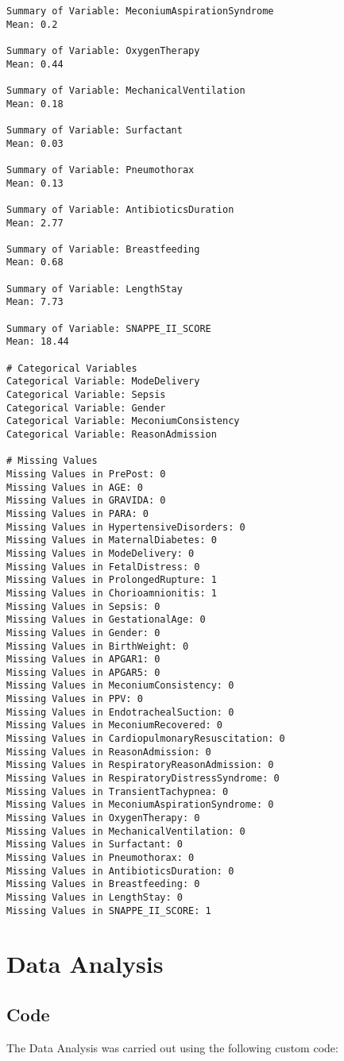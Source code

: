 \documentclass[11pt]{article}
\begin{document}
\begin{Verbatim}[tabsize=4]
Summary of Variable: MeconiumAspirationSyndrome
Mean: 0.2

Summary of Variable: OxygenTherapy
Mean: 0.44

Summary of Variable: MechanicalVentilation
Mean: 0.18

Summary of Variable: Surfactant
Mean: 0.03

Summary of Variable: Pneumothorax
Mean: 0.13

Summary of Variable: AntibioticsDuration
Mean: 2.77

Summary of Variable: Breastfeeding
Mean: 0.68

Summary of Variable: LengthStay
Mean: 7.73

Summary of Variable: SNAPPE_II_SCORE
Mean: 18.44

# Categorical Variables
Categorical Variable: ModeDelivery
Categorical Variable: Sepsis
Categorical Variable: Gender
Categorical Variable: MeconiumConsistency
Categorical Variable: ReasonAdmission

# Missing Values
Missing Values in PrePost: 0
Missing Values in AGE: 0
Missing Values in GRAVIDA: 0
Missing Values in PARA: 0
Missing Values in HypertensiveDisorders: 0
Missing Values in MaternalDiabetes: 0
Missing Values in ModeDelivery: 0
Missing Values in FetalDistress: 0
Missing Values in ProlongedRupture: 1
Missing Values in Chorioamnionitis: 1
Missing Values in Sepsis: 0
Missing Values in GestationalAge: 0
Missing Values in Gender: 0
Missing Values in BirthWeight: 0
Missing Values in APGAR1: 0
Missing Values in APGAR5: 0
Missing Values in MeconiumConsistency: 0
Missing Values in PPV: 0
Missing Values in EndotrachealSuction: 0
Missing Values in MeconiumRecovered: 0
Missing Values in CardiopulmonaryResuscitation: 0
Missing Values in ReasonAdmission: 0
Missing Values in RespiratoryReasonAdmission: 0
Missing Values in RespiratoryDistressSyndrome: 0
Missing Values in TransientTachypnea: 0
Missing Values in MeconiumAspirationSyndrome: 0
Missing Values in OxygenTherapy: 0
Missing Values in MechanicalVentilation: 0
Missing Values in Surfactant: 0
Missing Values in Pneumothorax: 0
Missing Values in AntibioticsDuration: 0
Missing Values in Breastfeeding: 0
Missing Values in LengthStay: 0
Missing Values in SNAPPE_II_SCORE: 1

\end{Verbatim}

\section{Data Analysis} \subsection{Code}The Data Analysis was carried out using the following custom code:
\end{document}
